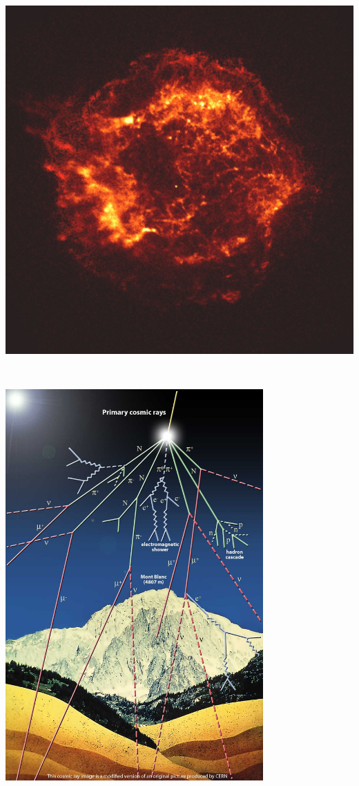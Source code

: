 \Tr
\begin{center}
\includegraphics[keepaspectratio,height=15cm]{Cas_A}
\end{center}

\Tr
\twocolumn
\begin{center}
\includegraphics[keepaspectratio,height=15cm]{cosray}
\end{center}

